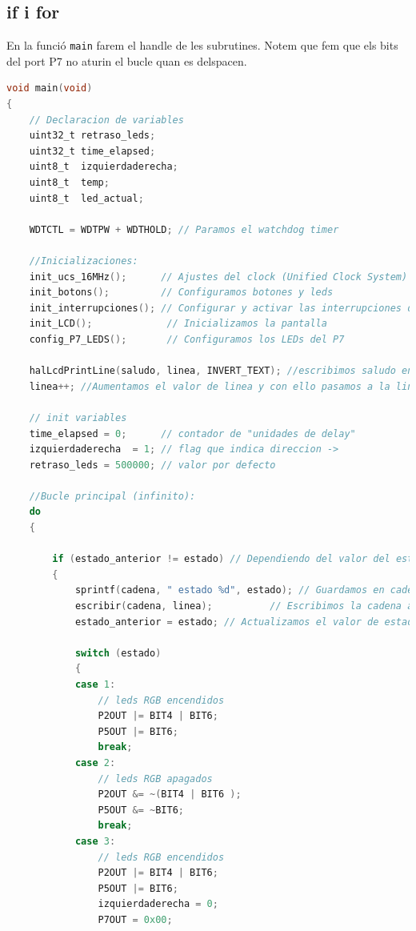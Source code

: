 \documentclass[12pt,a4paper]{article}
\begin{document}
\subsection{if i for}

En la funció \texttt{main} farem el handle de les subrutines. Notem que fem que els bits del port P7 no aturin el bucle quan es delspacen.

\begin{lstlisting}[language=C]
void main(void)
{
    // Declaracion de variables
    uint32_t retraso_leds;
    uint32_t time_elapsed;
    uint8_t  izquierdaderecha;
    uint8_t  temp;
    uint8_t  led_actual;

    WDTCTL = WDTPW + WDTHOLD; // Paramos el watchdog timer

    //Inicializaciones:
    init_ucs_16MHz();      // Ajustes del clock (Unified Clock System)
    init_botons();         // Configuramos botones y leds
    init_interrupciones(); // Configurar y activar las interrupciones de los botones
    init_LCD();             // Inicializamos la pantalla
    config_P7_LEDS();       // Configuramos los LEDs del P7

    halLcdPrintLine(saludo, linea, INVERT_TEXT); //escribimos saludo en la primera linea
    linea++; //Aumentamos el valor de linea y con ello pasamos a la linea siguiente

    // init variables
    time_elapsed = 0;      // contador de "unidades de delay"
    izquierdaderecha  = 1; // flag que indica direccion ->
    retraso_leds = 500000; // valor por defecto

    //Bucle principal (infinito):
    do
    {

        if (estado_anterior != estado) // Dependiendo del valor del estado se encendera un LED u otro.
        {
            sprintf(cadena, " estado %d", estado); // Guardamos en cadena la siguiente frase: estado "valor del estado"
            escribir(cadena, linea);          // Escribimos la cadena al LCD
            estado_anterior = estado; // Actualizamos el valor de estado_anterior, para que no esta siempre escribiendo.

            switch (estado)
            {
            case 1:
                // leds RGB encendidos
                P2OUT |= BIT4 | BIT6;
                P5OUT |= BIT6;
                break;
            case 2:
                // leds RGB apagados
                P2OUT &= ~(BIT4 | BIT6 );
                P5OUT &= ~BIT6;
                break;
            case 3:
                // leds RGB encendidos
                P2OUT |= BIT4 | BIT6;
                P5OUT |= BIT6;
                izquierdaderecha = 0;
                P7OUT = 0x00;


\end{lstlisting}
\end{document}
